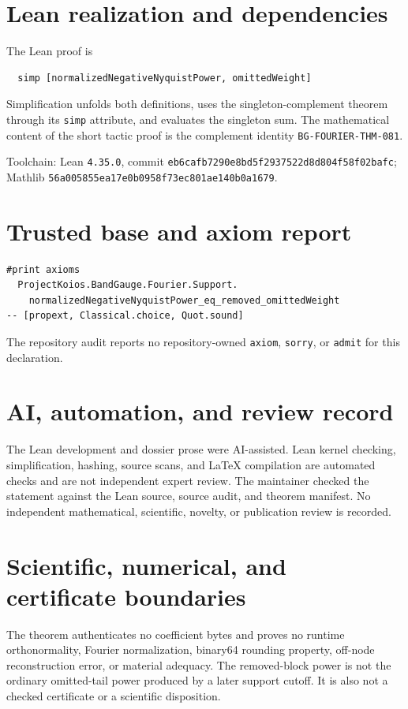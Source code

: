 \documentclass[11pt]{article}
\begin{document}
\section{Lean realization and dependencies}
The Lean proof is
\begin{verbatim}
  simp [normalizedNegativeNyquistPower, omittedWeight]
\end{verbatim}
Simplification unfolds both definitions, uses the singleton-complement theorem through its
\texttt{simp} attribute, and evaluates the singleton sum.  The mathematical content of the short
tactic proof is the complement identity \texttt{BG-FOURIER-THM-081}.

Toolchain: Lean \texttt{4.35.0}, commit
\texttt{eb6cafb7290e8bd5f2937522d8d804f58f02bafc}; Mathlib
\texttt{56a005855ea17e0b0958f73ec801ae140b0a1679}.

\section{Trusted base and axiom report}
\begin{verbatim}
#print axioms
  ProjectKoios.BandGauge.Fourier.Support.
    normalizedNegativeNyquistPower_eq_removed_omittedWeight
-- [propext, Classical.choice, Quot.sound]
\end{verbatim}
The repository audit reports no repository-owned \texttt{axiom}, \texttt{sorry}, or
\texttt{admit} for this declaration.

\section{AI, automation, and review record}
The Lean development and dossier prose were AI-assisted.  Lean kernel checking, simplification,
hashing, source scans, and LaTeX compilation are automated checks and are not independent expert
review.  The maintainer checked the statement against the Lean source, source audit, and theorem
manifest.  No independent mathematical, scientific, novelty, or publication review is recorded.

\section{Scientific, numerical, and certificate boundaries}
The theorem authenticates no coefficient bytes and proves no runtime orthonormality, Fourier
normalization, binary64 rounding property, off-node reconstruction error, or material adequacy.
The removed-block power is not the ordinary omitted-tail power produced by a later support cutoff.
It is also not a checked certificate or a scientific disposition.
\end{document}
